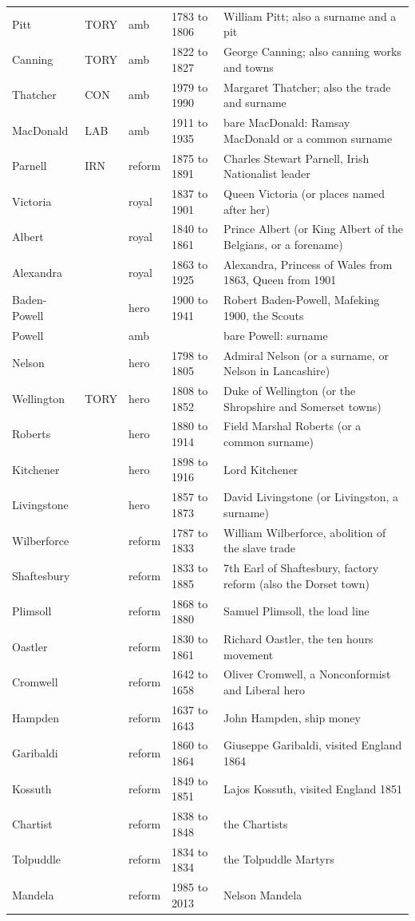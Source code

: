 \documentclass[11pt,a4paper]{article}
\begin{document}
\begin{small}
\begin{longtable}{llllp{7.4cm}}
Pitt & TORY & amb & 1783 to 1806 & William Pitt; also a surname and a pit\\
Canning & TORY & amb & 1822 to 1827 & George Canning; also canning works and towns\\
Thatcher & CON & amb & 1979 to 1990 & Margaret Thatcher; also the trade and surname\\
MacDonald & LAB & amb & 1911 to 1935 & bare MacDonald: Ramsay MacDonald or a common surname\\
Parnell & IRN & reform & 1875 to 1891 & Charles Stewart Parnell, Irish Nationalist leader\\
Victoria &  & royal & 1837 to 1901 & Queen Victoria (or places named after her)\\
Albert &  & royal & 1840 to 1861 & Prince Albert (or King Albert of the Belgians, or a forename)\\
Alexandra &  & royal & 1863 to 1925 & Alexandra, Princess of Wales from 1863, Queen from 1901\\
Baden-Powell &  & hero & 1900 to 1941 & Robert Baden-Powell, Mafeking 1900, the Scouts\\
Powell &  & amb &  & bare Powell: surname\\
Nelson &  & hero & 1798 to 1805 & Admiral Nelson (or a surname, or Nelson in Lancashire)\\
Wellington & TORY & hero & 1808 to 1852 & Duke of Wellington (or the Shropshire and Somerset towns)\\
Roberts &  & hero & 1880 to 1914 & Field Marshal Roberts (or a common surname)\\
Kitchener &  & hero & 1898 to 1916 & Lord Kitchener\\
Livingstone &  & hero & 1857 to 1873 & David Livingstone (or Livingston, a surname)\\
Wilberforce &  & reform & 1787 to 1833 & William Wilberforce, abolition of the slave trade\\
Shaftesbury &  & reform & 1833 to 1885 & 7th Earl of Shaftesbury, factory reform (also the Dorset town)\\
Plimsoll &  & reform & 1868 to 1880 & Samuel Plimsoll, the load line\\
Oastler &  & reform & 1830 to 1861 & Richard Oastler, the ten hours movement\\
Cromwell &  & reform & 1642 to 1658 & Oliver Cromwell, a Nonconformist and Liberal hero\\
Hampden &  & reform & 1637 to 1643 & John Hampden, ship money\\
Garibaldi &  & reform & 1860 to 1864 & Giuseppe Garibaldi, visited England 1864\\
Kossuth &  & reform & 1849 to 1851 & Lajos Kossuth, visited England 1851\\
Chartist &  & reform & 1838 to 1848 & the Chartists\\
Tolpuddle &  & reform & 1834 to 1834 & the Tolpuddle Martyrs\\
Mandela &  & reform & 1985 to 2013 & Nelson Mandela\\
\bottomrule\end{longtable}\end{small}
\end{document}

